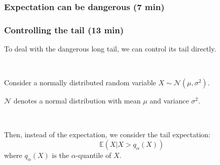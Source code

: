 \documentclass{beamer}
\newcommand{\E}{\ensuremath{\mathbb{E}}}
\begin{document}
\begin{frame}
	\frametitle{Expectation can be dangerous (7 min)}
%
\end{frame}

\begin{frame}
	\frametitle{Controlling the tail (13 min)}
	To deal with the dangerous long tail, we can control its tail directly.\pause
	
	~
	
	Consider a normally distributed random variable $X\sim \mathcal{N}(\mu, \sigma^2)$. 
	
	$\mathcal{N}$ denotes a normal distribution with mean $\mu$ and variance $\sigma^2$.\pause
	
	~
	
	Then, instead of the expectation, we consider the tail expectation:
	$$ \E(X | X > q_\alpha(X))
	$$
	where $q_\alpha(X)$ is the $\alpha$-quantile of $X$.
\end{frame}

\end{document}
